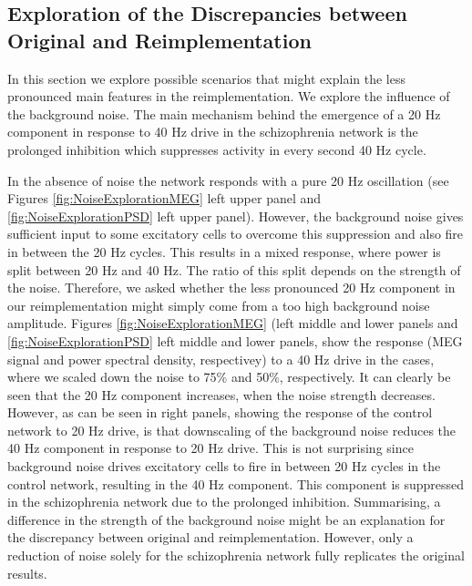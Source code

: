 \documentclass[10pt,a4paper,onecolumn]{article}
\begin{document}
\FloatBarrier

\subsection{Exploration of the Discrepancies between Original and Reimplementation}
In this section we explore possible scenarios that might explain the less pronounced main features in the reimplementation.
We explore the influence of the background noise. The main mechanism behind the emergence of a 20 Hz component in response
to 40 Hz drive in the schizophrenia network is the prolonged inhibition which suppresses activity in every second 40 Hz cycle. 




In the absence
of noise the network responds with a pure 20 Hz oscillation (see Figures \ref{fig:NoiseExplorationMEG} left upper panel and \ref{fig:NoiseExplorationPSD} left upper panel). However, the background noise
gives sufficient input to some excitatory cells to overcome this suppression and also fire in between the 20 Hz cycles. This results in a mixed response, 
where power is split between 20 Hz and 40 Hz. The ratio of this split depends on the strength of the noise. Therefore, we asked whether the less pronounced
20 Hz component in our reimplementation might simply come from a too high background noise amplitude. Figures \ref{fig:NoiseExplorationMEG} (left middle and lower panels  and \ref{fig:NoiseExplorationPSD} left middle and lower panels, show the 
response (MEG signal and power spectral density, respectivey) to a 40 Hz drive in the cases, where we scaled down the noise to 75\% and 50\%, respectively. It can clearly be seen that the 20 Hz component increases, when
the noise strength decreases. However, as can be seen in right panels, showing the response of the control network to 20 Hz drive,
is that downscaling of the background noise reduces the 40 Hz component in response to 20 Hz drive. This is not surprising since background noise drives excitatory cells to fire in between 20 Hz cycles in the control network, resulting
in the 40 Hz component. This component is suppressed in the schizophrenia network due to the prolonged inhibition.
Summarising, a difference in the strength of the background noise might be an explanation for the discrepancy between original and reimplementation. However, only a reduction of noise solely for the schizophrenia network 
fully replicates the original results. 
\end{document}
